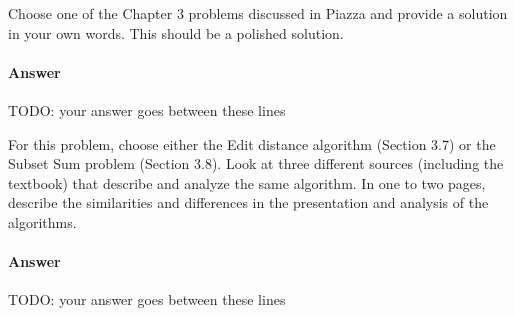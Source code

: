 \documentclass{article}
\begin{document}

\nextprob
{}

Choose one of the Chapter 3 problems discussed in Piazza and provide a solution
in your own words.  This should be a polished solution.

\paragraph{Answer}

TODO: your answer goes between these lines


\nextprob
{}

For this problem, choose either the Edit distance algorithm (Section 3.7) or the
Subset Sum problem (Section 3.8). Look at three different sources (including the
textbook) that describe
and analyze the same algorithm. In one to two pages, describe the similarities
and differences in the presentation and analysis of the algorithms.

\paragraph{Answer}


TODO: your answer goes between these lines

\end{document}
